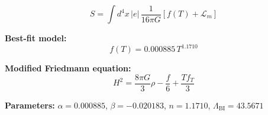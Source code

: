 
\begin{equation}
  S = \int d^4x \, |e| \, \frac{1}{16\pi G} \left[ f(T) + \mathcal{L}_m \right]
\end{equation}

\textbf{Best-fit model:}
\begin{equation}
  f(T) = 0.000885 \, T^{1.1710}
\end{equation}

\textbf{Modified Friedmann equation:}
\begin{equation}
  H^2 = \frac{8\pi G}{3} \rho - \frac{f}{6} + \frac{T f_T}{3}
\end{equation}

\textbf{Parameters:}
$\alpha = 0.000885$, \quad
$\beta = -0.020183$, \quad
$n = 1.1710$, \quad
$\Lambda_{\text{BI}} = 43.5671$